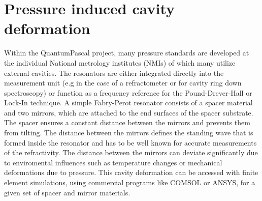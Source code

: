 \section{Pressure induced cavity deformation}
Within the QuantumPascal project, many pressure standards are developed at the individual National metrology institutes (NMIs) of which many utilize external cavities. The resonators are either integrated directly into the measurement unit (e.g in the case of a refractometer or for cavity ring down spectroscopy) or function as a frequency reference for the Pound-Drever-Hall or Lock-In technique. A simple Fabry-Perot resonator consists of a spacer material and two mirrors, which are attached to the end surfaces of the spacer substrate. The spacer ensures a constant distance between the mirrors and prevents them from tilting. The distance between the mirrors defines the standing wave that is formed inside the resonator and has to be well known for accurate measurements of the refractivity. The distance between the mirrors can deviate significantly due to enviromental influences such as temperature changes or mechanical deformations due to pressure. This cavity deformation can be accessed with finite element simulations, using commercial programs like COMSOL or ANSYS, for a given set of spacer and mirror materials.

